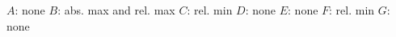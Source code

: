 {\begin{minipage}{\linewidth}
\end{minipage}
}
{$A$: none
$B$: abs. max and rel. max
$C$: rel. min
$D$: none
$E$: none
$F$: rel. min
$G$: none
}
